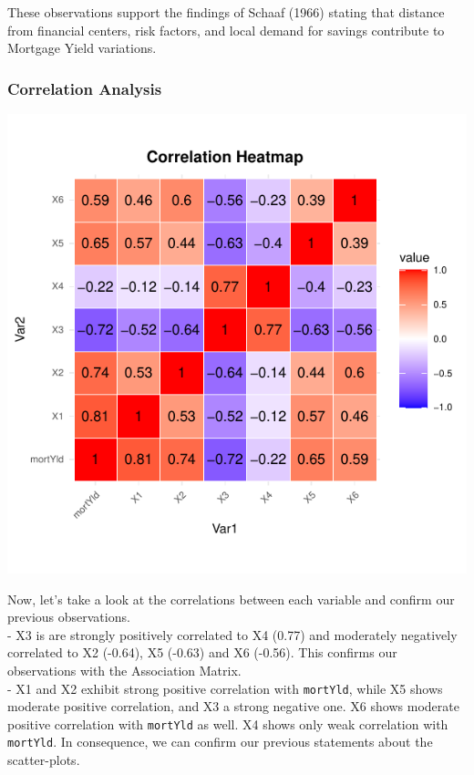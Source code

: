 \documentclass[
  11pt,
]{article}
\begin{document}
These observations support the findings of Schaaf (1966) stating that
distance from financial centers, risk factors, and local demand for
savings contribute to Mortgage Yield variations.\\

\subsubsection{Correlation Analysis}\label{correlation-analysis}

\includegraphics{Figs/unnamed-chunk-7-1.pdf}

Now, let's take a look at the correlations between each variable and
confirm our previous observations.\\
- X3 is are strongly positively correlated to X4 (0.77) and moderately
negatively correlated to X2 (-0.64), X5 (-0.63) and X6 (-0.56). This
confirms our observations with the Association Matrix.\\
- X1 and X2 exhibit strong positive correlation with \texttt{mortYld},
while X5 shows moderate positive correlation, and X3 a strong negative
one. X6 shows moderate positive correlation with \texttt{mortYld} as
well. X4 shows only weak correlation with \texttt{mortYld}. In
consequence, we can confirm our previous statements about the
scatter-plots.
\end{document}
